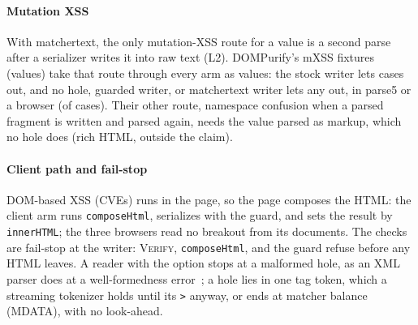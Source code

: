 \paragraph{Mutation XSS}
With matchertext, the only mutation-XSS route for a value is a second parse after
a serializer writes it into raw text (L2). DOMPurify's mXSS fixtures~\cite{dompurify_fixtures}
(\dataHtmlMxssProbes values) take that route through every arm as values: the
stock writer lets \dataHtmlMxssStockBreakout cases out, and no hole, guarded
writer, or matchertext writer lets any out, in parse5 or a browser
(\dataHtmlMxssContainedBreakout of \dataHtmlMxssCases cases). Their other route,
namespace confusion when a parsed fragment is written and parsed again, needs the
value parsed as markup, which no hole does (rich HTML, outside the claim).

\paragraph{Client path and fail-stop}
DOM-based XSS (\dataSubTechniqueDomBased CVEs) runs in the page, so the page
composes the HTML: the client arm runs \texttt{composeHtml}, serializes with the
guard, and sets the result by \texttt{innerHTML}; the three browsers read no
breakout from its \dataHtmlComposeDomCases documents. The checks are fail-stop at
the writer: \textsc{Verify},
\texttt{composeHtml}, and the guard refuse before any HTML leaves. A reader with
the option stops at a malformed hole, as an XML parser does at a well-formedness
error~\cite{xml10}; a hole lies in one tag token, which a streaming tokenizer
holds until its \verb|>| anyway, or ends at matcher balance (MDATA), with no
look-ahead.
